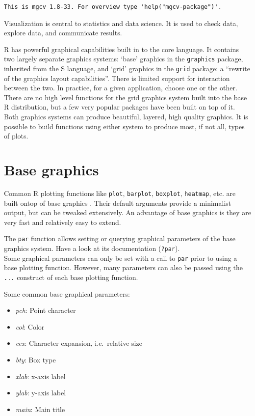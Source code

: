 \documentclass[
]{book}
\providecommand{\tightlist}{%
  \setlength{\itemsep}{0pt}\setlength{\parskip}{0pt}}
\begin{document}
\begin{verbatim}
This is mgcv 1.8-33. For overview type 'help("mgcv-package")'.
\end{verbatim}

Visualization is central to statistics and data science. It is used to check data, explore data, and communicate results.

R has powerful graphical capabilities built in to the core language. It contains two largely separate graphics systems: `base' graphics in the \texttt{graphics} package, inherited from the S language, and `grid' graphics in the \texttt{grid} package: a ``rewrite of the graphics layout capabilities''. There is limited support for interaction between the two. In practice, for a given application, choose one or the other. There are no high level functions for the grid graphics system built into the base R distribution, but a few very popular packages have been built on top of it. Both graphics systems can produce beautiful, layered, high quality graphics. It is possible to build functions using either system to produce most, if not all, types of plots.

\hypertarget{base-graphics}{%
\section{Base graphics}\label{base-graphics}}

Common R plotting functions like \texttt{plot}, \texttt{barplot}, \texttt{boxplot}, \texttt{heatmap}, etc. are built ontop of base graphics \citep{murrell2018r}. Their default arguments provide a minimalist output, but can be tweaked extensively. An advantage of base graphics is they are very fast and relatively easy to extend.

The \texttt{par} function allows setting or querying graphical parameters of the base graphics system. Have a look at its documentation (\texttt{?par}).\\
Some graphical parameters can only be set with a call to \texttt{par} prior to using a base plotting function. However, many parameters can also be passed using the \texttt{...} construct of each base plotting function.

Some common base graphical parameters:

\begin{itemize}
\tightlist
\item
  \emph{pch}: Point character
\item
  \emph{col}: Color
\item
  \emph{cex}: Character expansion, i.e.~relative size
\item
  \emph{bty}: Box type
\item
  \emph{xlab}: x-axis label
\item
  \emph{ylab}: y-axis label
\item
  \emph{main}: Main title
\end{itemize}
\end{document}
